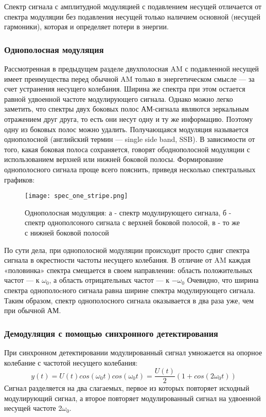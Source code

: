 Спектр сигнала с амплитудной модуляцией с подавлением несущей отличается от спектра модуляции без подавления несущей только наличием основной (несущей гармоники), которая и определяет потери в энергии. 

\subsubsection{Однополосная модуляция}
Рассмотренная в предыдущем разделе двухполосная AM с подавленной несущей имеет преимущества перед обычной AM только в энергетическом смысле — за счет устранения несущего колебания. Ширина же спектра при этом остается равной удвоенной частоте модулирующего сигнала.
Однако можно легко заметить, что спектры двух боковых полос АМ-сигнала являются зеркальным отражением друг друга, то есть они несут одну и ту же информацию. Поэтому одну из боковых полос можно удалить. Получающаяся модуляция называется однополосной (английский термин — single side band, SSB).
В зависимости от того, какая боковая полоса сохраняется, говорят ободнополосной модуляции с использованием верхней или нижней боковой полосы. Формирование однополосного сигнала проще всего пояснить, приведя несколько спектральных графиков:  

\begin{figure}[H]
	\begin{center}
		\texttt{[image: spec\_one\_stripe.png]}
		\caption{Однополосная модуляция: а - спектр модулирующего сигнала,
		б - спектр однополсоного сигнала с верхней боковой полосой, в - то же с нижней боковой 			        полосой} 
		\label{pic:spec_one_stripe} %
	\end{center}
\end{figure}

По сути дела, при однополосной модуляции происходит просто сдвиг спектра сигнала в окрестности частоты несущего колебания. В отличие от AM каждая «половинка» спектра смещается в своем направлении: область положительных частот — к $ \omega_0 $, а область отрицательных частот — к $  - \omega_0 $
Очевидно, что ширина спектра однополоcного сигнала равна ширине спектра модулирующего сигнала. Таким образом, спектр однополосного сигнала оказывается в два раза уже, чем при обычной АМ.

\subsubsection{Демодуляция с помощью синхронного детектирования}
При синхронном детектировании модулированный сигнал умножается на опорное колебание с частотой несущего колебания:
 \begin{equation}\label{eq04}
 	y(t) = U(t) cos(\omega_0 t) cos(\omega_0 t) = \frac{U(t)}{2} (1 + cos(2\omega_0 t))
\end{equation}
Сигнал разделяется на два слагаемых, первое из которых повторяет исходный модулирующий сигнал, а второе повторяет модулированный сигнал на удвоенной несущей частоте 2$\omega_0$. 

